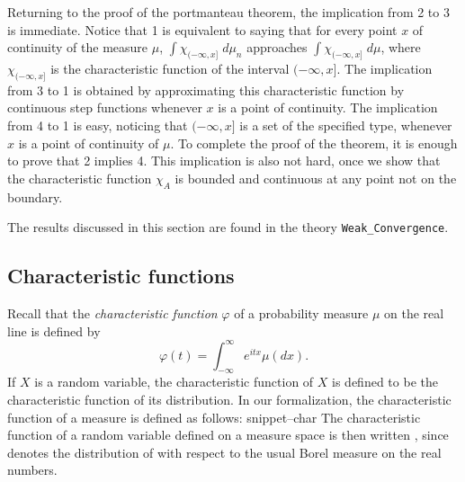 \documentclass{svjour3}
\newcommand{\ph}{\varphi}
\newcommand{\Snippet}[1]{\csname snippet--#1\endcsname}
\begin{document}
Returning to the proof of the portmanteau theorem, the implication from 2 to 3 is immediate. Notice that 1 is equivalent to saying that for every point $x$ of continuity of the measure $\mu$, $\int \chi_{(-\infty,x]} \; d\mu_n$ approaches $\int \chi_{(-\infty,x]} \; d\mu$, where $\chi_{(-\infty,x]}$ is the characteristic function of the interval $(-\infty,x]$. The implication from 3 to 1 is obtained by approximating this characteristic function by continuous step functions whenever $x$ is a point of continuity. The implication from 4 to 1 is easy, noticing that $(-\infty,x]$ is a set of the specified type, whenever $x$ is a point of continuity of $\mu$. To complete the proof of the theorem, it is enough to prove that 2 implies 4. This implication is also not hard, once we show that the characteristic function $\chi_A$ is bounded and continuous at any point not on the boundary.

The results discussed in this section are found in the theory \texttt{Weak\_Convergence}.

\subsection{Characteristic functions}
\label{subsection:characteristic}

Recall that the \emph{characteristic function} $\ph$ of a probability measure $\mu$ on the real line is defined by
\[
\ph(t) = \int_{-\infty}^{\infty} e^{itx} \mu(dx).
\]
If $X$ is a random variable, the characteristic function of $X$ is defined to be the characteristic function of its distribution.
In our formalization, the characteristic function of a measure is defined as follows:
\Snippet{char}
The characteristic function of a random variable  defined on a measure space  is then written , since  denotes the distribution of  with respect to the usual Borel measure on the real numbers.
\end{document}

